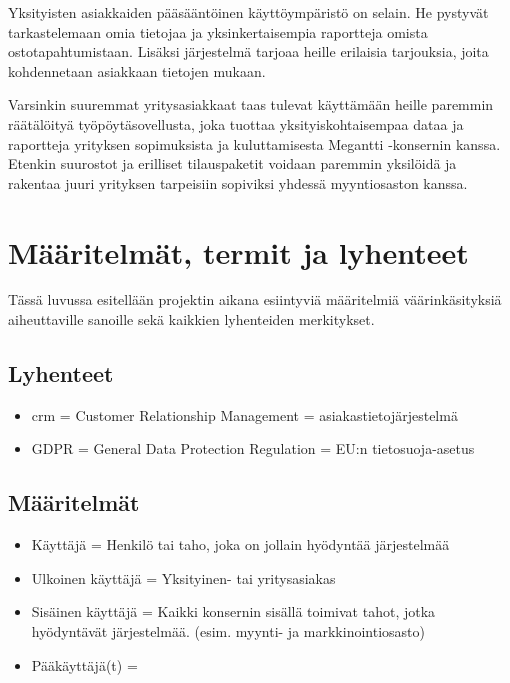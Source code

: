         Yksityisten asiakkaiden pääsääntöinen käyttöympäristö on selain. He pystyvät tarkastelemaan omia tietojaa ja yksinkertaisempia raportteja omista 
        ostotapahtumistaan. Lisäksi järjestelmä tarjoaa heille erilaisia tarjouksia, joita kohdennetaan asiakkaan tietojen mukaan.

        Varsinkin suuremmat yritysasiakkaat taas tulevat käyttämään heille paremmin räätälöityä työpöytäsovellusta, joka tuottaa yksityiskohtaisempaa
        dataa ja raportteja yrityksen sopimuksista ja kuluttamisesta Megantti -konsernin kanssa. Etenkin suurostot ja erilliset tilauspaketit 
        voidaan paremmin yksilöidä ja rakentaa juuri yrityksen tarpeisiin sopiviksi yhdessä myyntiosaston kanssa.


\section{Määritelmät, termit ja lyhenteet}

    Tässä luvussa esitellään projektin aikana esiintyviä määritelmiä väärinkäsityksiä aiheuttaville sanoille sekä kaikkien lyhenteiden merkitykset.

    \subsection{Lyhenteet}
        \begin{itemize}
		\item \gls{crm} = Customer Relationship Management = asiakastietojärjestelmä
            \item GDPR = General Data Protection Regulation = EU:n tietosuoja-asetus
            
        \end{itemize}

    \subsection{Määritelmät}
        \begin{itemize}
            \item Käyttäjä = Henkilö tai taho, joka on jollain hyödyntää järjestelmää
            \item Ulkoinen käyttäjä = Yksityinen- tai yritysasiakas
            \item Sisäinen käyttäjä = Kaikki konsernin sisällä toimivat tahot, jotka hyödyntävät järjestelmää. (esim. myynti- ja markkinointiosasto)
            \item Pääkäyttäjä(t) =  
            
        \end{itemize}

    

